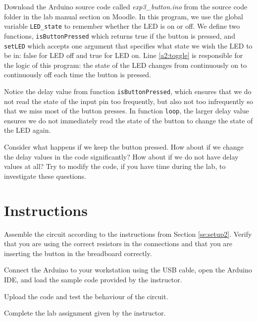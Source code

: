 \documentclass[12pt]{book}
\begin{document}
Download the Arduino source code called \emph{exp3\_button.ino} from the source code folder in the lab manual section on Moodle.
In this program, we use the global variable \lstinline$LED_state$ to
remember whether the LED is on or off. We define two functions,
\lstinline$isButtonPressed$ which returns true if the button is
pressed, and \lstinline$setLED$ which accepts one argument that
specifies what state we wish the LED to be in: false for LED off and
true for LED on. Line \ref*{a2:toggle} is responsible for the logic of
this program: the state of the LED changes from continuously on to
continuously off each time the button is pressed. 

Notice the delay value from function \lstinline$isButtonPressed$, which
ensures that we do not read the state of the input pin too frequently,
but also not too infrequently so that we miss most of the button
presses. In function \lstinline$loop$, the larger delay value ensures
we do not immediately read the state of the button to change the state
of the LED again. 

Consider what happens if we keep the button pressed. How about if we
change the delay values in the code significantly? How about if we do
not have delay values at all? Try to modify the code, if you have time
during the lab, to investigate these questions.



\section{Instructions}

\begin{compactitem}[--]
\item Assemble the circuit according to the instructions from Section
  \ref{se:setup2}. Verify that you are using the correct resistors in
  the connections and that you are inserting the button in the
  breadboard correctly. 
\item Connect the Arduino to your workstation using the USB cable,
  open the Arduino IDE, and load the sample code provided by the
  instructor. 
\item Upload the code and test the behaviour of the circuit.
\item Complete the lab assignment given by the instructor.
\end{compactitem}
\end{document}
